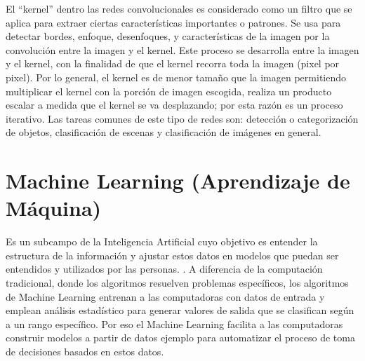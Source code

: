 El ``kernel'' dentro las redes convolucionales es considerado como un filtro que se aplica para extraer ciertas características importantes o patrones. Se usa para detectar bordes, enfoque, desenfoques, y características de la imagen por la convolución entre la imagen y el kernel. Este proceso se desarrolla entre la imagen y el kernel, con la finalidad de que el kernel recorra toda la imagen (pixel por pixel). Por lo general, el kernel es de menor tamaño que la imagen permitiendo multiplicar el kernel con la porción de imagen escogida, realiza un producto escalar a medida que el kernel se va desplazando; por esta razón es un proceso iterativo. Las tareas comunes de este tipo de redes son: detección o categorización de objetos, clasificación de escenas y clasificación de imágenes en general.\\


\section{Machine Learning (Aprendizaje de Máquina)}
Es un subcampo de la Inteligencia Artificial cuyo objetivo es entender la estructura de la información y ajustar estos datos en modelos que puedan ser entendidos y utilizados por las personas. \cite{digitalocean:machinelearning}. A diferencia de la computación tradicional, donde los algoritmos resuelven problemas específicos, los algoritmos de Machine Learning entrenan a las computadoras con datos de entrada y emplean análisis estadístico para generar valores de salida que se clasifican según a un rango específico. Por eso el Machine Learning facilita a las computadoras construir modelos a partir de datos ejemplo para automatizar el proceso de toma de decisiones basados en estos datos.\\

